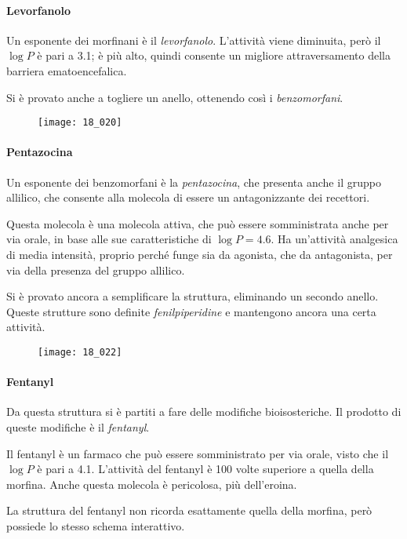 \paragraph{Levorfanolo}
Un esponente dei morfinani è il \emph{levorfanolo}. L'attività viene
diminuita, però il \(\log{} P\) è pari a 3.1; è più alto, quindi
consente un migliore attraversamento della barriera ematoencefalica.

Si è provato anche a togliere un anello, ottenendo così i
\emph{benzomorfani}.
\begin{figure}[H]
  \centering
  \texttt{[image: 18\_020]}
\end{figure}

\paragraph{Pentazocina}
Un esponente dei benzomorfani è la \emph{pentazocina}, che presenta
anche il gruppo allilico, che consente alla molecola di essere un
antagonizzante dei recettori.

Questa molecola è una molecola attiva, che può essere somministrata
anche per via orale, in base alle sue caratteristiche di
\(\log{} P = 4.6\). Ha un'attività analgesica di media intensità,
proprio perché funge sia da agonista, che da antagonista, per via della
presenza del gruppo allilico.

Si è provato ancora a semplificare la struttura, eliminando un secondo
anello. Queste strutture sono definite \emph{fenilpiperidine} e
mantengono ancora una certa attività.
\begin{figure}[H]
  \centering
  \texttt{[image: 18\_022]}
\end{figure}

\paragraph{Fentanyl}
Da questa struttura si è partiti a fare delle modifiche bioisosteriche.
Il prodotto di queste modifiche è il \emph{fentanyl}.

Il fentanyl è un farmaco che può essere somministrato per via orale,
visto che il \(\log{} P\) è pari a 4.1. L'attività del fentanyl è 100
volte superiore a quella della morfina. Anche questa molecola è
pericolosa, più dell'eroina.

La struttura del fentanyl non ricorda esattamente quella della morfina,
però possiede lo stesso schema interattivo.

